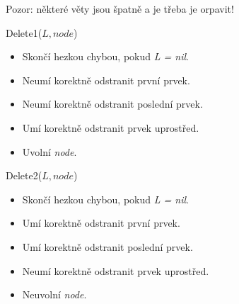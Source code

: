\documentclass[14pt,a4paper]{extarticle}
\begin{document}
\pagestyle{empty}
\noindent
\setlength\parindent{0pt}

Pozor: některé věty jsou špatně a je třeba je orpavit!

\begin{procedure}[H]
	\caption{Delete1($\mathit{L,node}$)}
	\BlankLine
	 
\end{procedure}

\begin{itemize}
	\setlength{\itemsep}{0em}
	\item Skončí hezkou chybou, pokud \textit{L = nil}.
	\item Neumí korektně odstranit první prvek.
	\item Neumí korektně odstranit poslední prvek.
	\item Umí korektně odstranit prvek uprostřed.
	\item Uvolní \textit{node}.
\end{itemize}

\vspace{0.5em}


\begin{procedure}[H]
	\caption{Delete2($\mathit{L,node}$)}
	\BlankLine
\end{procedure}

\begin{itemize}
	\setlength{\itemsep}{0em}
	\item Skončí hezkou chybou, pokud \textit{L = nil}.
	\item Umí korektně odstranit první prvek.
	\item Umí korektně odstranit poslední prvek.
	\item Neumí korektně odstranit prvek uprostřed.
	\item Neuvolní \textit{node}.
\end{itemize}
\end{document}
